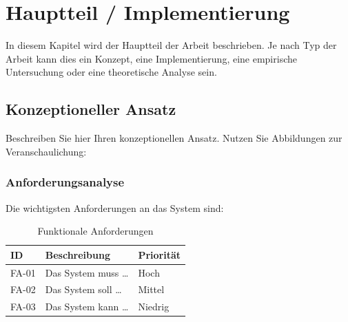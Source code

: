 
\chapter{Hauptteil / Implementierung}
\label{chap:hauptteil}


In diesem Kapitel wird der Hauptteil der Arbeit beschrieben. Je nach Typ der Arbeit kann dies ein Konzept, eine Implementierung, eine empirische Untersuchung oder eine theoretische Analyse sein.

\section{Konzeptioneller Ansatz}
\label{sec:konzept}

Beschreiben Sie hier Ihren konzeptionellen Ansatz. Nutzen Sie Abbildungen zur Veranschaulichung:



\subsection{Anforderungsanalyse}

Die wichtigsten Anforderungen an das System sind:

\begin{table}[htbp]
    \centering
    \caption{Funktionale Anforderungen}
    \label{tab:anforderungen}
    \begin{tabular}{lp{8cm}l}
        \toprule
        \textbf{ID} & \textbf{Beschreibung} & \textbf{Priorität} \\
        \midrule
        FA-01 & Das System muss \dots & Hoch \\
        FA-02 & Das System soll \dots & Mittel \\
        FA-03 & Das System kann \dots & Niedrig \\
        \bottomrule
    \end{tabular}
\end{table}

